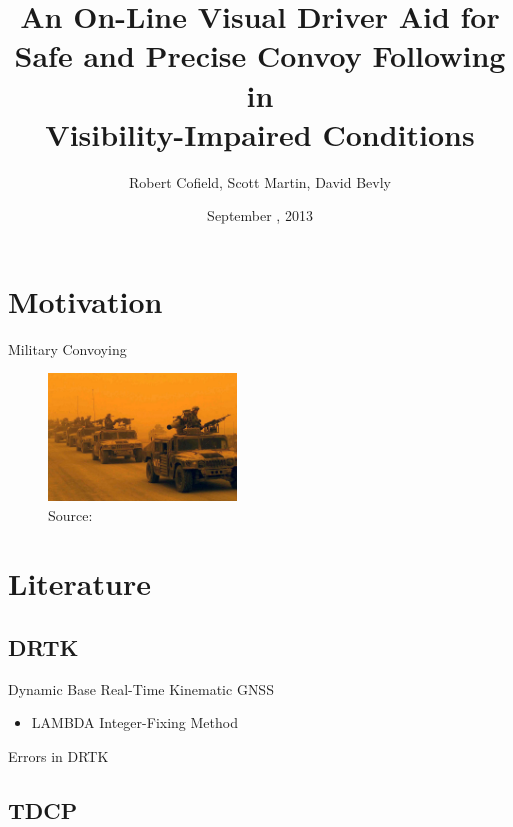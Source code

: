 \documentclass{beamer}
\title[DRTK Driver Assistance]{An On-Line Visual Driver Aid for\\ Safe and Precise Convoy Following in\\ Visibility-Impaired Conditions}
\author[]{Robert Cofield, Scott Martin, David Bevly}
\date{September , 2013}
\begin{document}
\frame{\titlepage}


\section{Motivation}

  \begin{frame}{Military Convoying}
    \begin{figure}
      \includegraphics[width=5cm]{../graphics/convoy_sandstorm_orange.jpg}
      \vspace{-10pt}
      \caption{\tiny Source: \citeauthor{convoy_dust_orange}}
    \end{figure}
  \end{frame}



\section{Literature}

  \subsection{DRTK}

    \begin{frame}{Dynamic Base Real-Time Kinematic GNSS}
      \begin{itemize}
        \item LAMBDA Integer-Fixing Method
      \end{itemize}
    \end{frame}

    \begin{frame}{Errors in DRTK}
    \end{frame}

  \subsection{TDCP}
\end{document}
